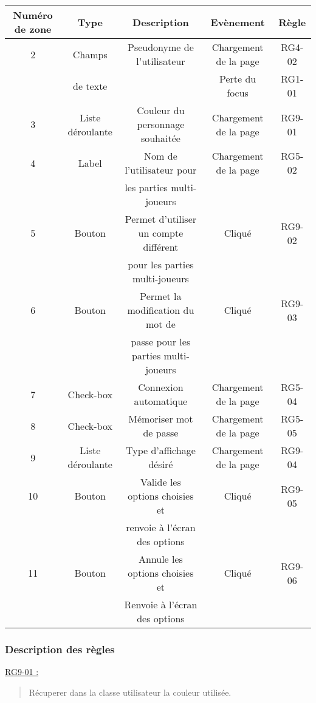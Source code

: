 \documentclass{report}
\begin{document}
			\begin{tabular}{|c|c|c|c|c|} \hline
				Numéro de zone & Type  & Description & Evènement &	Règle \\\hline
				2 & Champs   & Pseudonyme de l'utilisateur & Chargement de la page & RG4-02 \\
				  & de texte &                             & Perte du focus & RG1-01 \\\hline
				3 & Liste déroulante & Couleur du personnage souhaitée & Chargement de la page & RG9-01 \\\hline
				4 & Label & Nom de l'utilisateur pour & Chargement de la page & RG5-02 \\
				  &       & les parties multi-joueurs & & \\\hline
				5 & Bouton & Permet d'utiliser un compte différent & Cliqué & RG9-02 \\
				  &        & pour les parties multi-joueurs & & \\\hline
				6 & Bouton & Permet la modification du mot de & Cliqué & RG9-03 \\
				  &        & passe pour les parties multi-joueurs & & \\\hline
				7 & Check-box & Connexion automatique & Chargement de la page & RG5-04 \\\hline
				8 & Check-box & Mémoriser mot de passe & Chargement de la page & RG5-05 \\\hline
				9 & Liste déroulante & Type d'affichage désiré & Chargement de la page & RG9-04 \\\hline
				10 & Bouton & Valide les options choisies et & Cliqué & RG9-05 \\
				   &        & renvoie à l'écran des options &  & \\\hline
				11 & Bouton & Annule les options choisies et & Cliqué & RG9-06 \\
				   &        & Renvoie à l'écran des options &  &  \\\hline

			\end{tabular}
			
		\subsubsection{Description des règles}

			\underline{RG9-01 :}
				\begin{quote}
					Récuperer dans la classe utilisateur la couleur utilisée.
				\end{quote}
\end{document}
